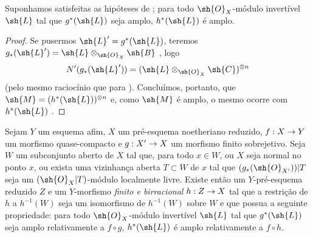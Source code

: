 \documentclass[oneside,10pt]{amsart}
\makeatletter
\newcommand{\ega@arrow}[2]{\mathchoice{#1}{#2}{#2}{#2}}
\renewcommand{\to}{\ega@arrow{\longrightarrow}{\rightarrow}}
\let\EGAOriginalLabel\label
\renewcommand{\label}[1]{\phantomsection\EGAOriginalLabel{#1}}
\makeatother
\begin{document}
\begin{corollary}[6.6.10]
\label{II.6.6.10}
Suponhamos satisfeitas as hipóteses de ;
para todo $\sh{O}_X$-módulo invertível $\sh{L}$ tal que $g^*(\sh{L})$ seja amplo, $h^*(\sh{L})$ é amplo.
\end{corollary}

\begin{proof}
Se pusermos $\sh{L}'=g^*(\sh{L})$, teremos $g_*(\sh{L}')=\sh{L}\otimes_{\sh{O}_X}\sh{B}$ , logo
\[
  N'(g_*(\sh{L}')) = (\sh{L}\otimes_{\sh{O}_X}\sh{C})^{\otimes n}
\]
(pelo mesmo raciocínio que para ).
Concluímos, portanto, que $\sh{M}=(h^*(\sh{L}))^{\otimes n}$ e, como $\sh{M}$ é amplo, o mesmo ocorre com $h^*(\sh{L})$ .
\end{proof}

\begin{proposition}[6.6.11]
\label{II.6.6.11}
Sejam $Y$ um esquema afim, $X$ um pré-esquema noetheriano reduzido, $f:X\to Y$ um morfismo quase-compacto e $g:X'\to X$ um morfismo finito sobrejetivo.
Seja $W$ um subconjunto aberto de $X$ tal que, para todo $x\in W$, ou $X$ seja normal no ponto $x$, ou exista uma vizinhança aberta $T\subset W$ de $x$ tal que $(g_*(\sh{O}_{X'}))|T$ seja um $(\sh{O}_X|T)$-módulo localmente livre.
Existe então um $Y$-pré-esquema reduzido $Z$ e um $Y$-morfismo \emph{finito e birracional} $h:Z\to X$ tal que a restrição de $h$ a $h^{-1}(W)$ seja um isomorfismo de $h^{-1}(W)$ sobre $W$ e que possua a seguinte propriedade: para todo $\sh{O}_X$-módulo invertível $\sh{L}$ tal que $g^*(\sh{L})$ seja amplo relativamente a $f\circ g$, $h^*(\sh{L})$ é amplo relativamente a $f\circ h$.
\end{proposition}
\end{document}
